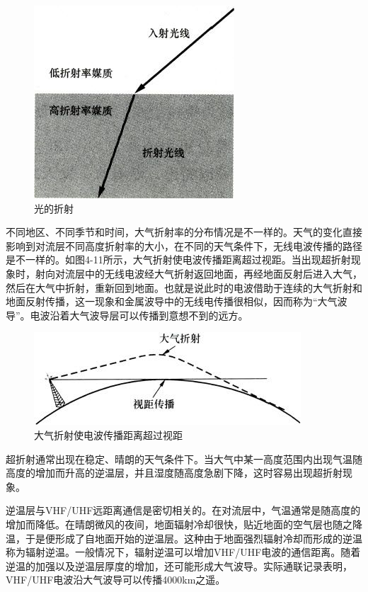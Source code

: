 \documentclass[12pt,UTF8]{ctexbook}
\begin{document}
\begin{figure}[htbp]
	\centering
	\includegraphics[width=0.7\linewidth]{53}
	\caption{光的折射}
	\label{fig:1}
\end{figure}

不同地区、不同季节和时间，大气折射率的分布情况是不一样的。天气的变化直接影响到对流层不同高度折射率的大小，在不同的天气条件下，无线电波传播的路径是不一样的。如图4-11所示，大气折射使电波传播距离超过视距。当出现超折射现象时，射向对流层中的无线电波经大气折射返回地面，再经地面反射后进入大气，然后在大气中折射，重新回到地面。也就是说此时的电波借助于连续的大气折射和地面反射传播，这一现象和金属波导中的无线电传播很相似，因而称为“大气波导”。电波沿着大气波导层可以传播到意想不到的远方。

\begin{figure}[htbp]
	\centering
	\includegraphics[width=0.7\linewidth]{54}
	\caption{大气折射使电波传播距离超过视距}
	\label{fig:1}
\end{figure}

超折射通常出现在稳定、晴朗的天气条件下。当大气中某一高度范围内出现气温随高度的增加而升高的逆温层，并且湿度随高度急剧下降，这时容易出现超折射现象。

逆温层与VHF/UHF远距离通信是密切相关的。在对流层中，气温通常是随高度的增加而降低。在晴朗微风的夜间，地面辐射冷却很快，贴近地面的空气层也随之降温，于是便形成了自地面开始的逆温层。这种由于地面强烈辐射冷却而形成的逆温称为辐射逆温。一般情况下，辐射逆温可以增加VHF/UHF电波的通信距离。随着逆温的加强以及逆温层厚度的增加，还可能形成大气波导。实际通联记录表明，VHF/UHF电波沿大气波导可以传播4000km之遥。
\end{document}

